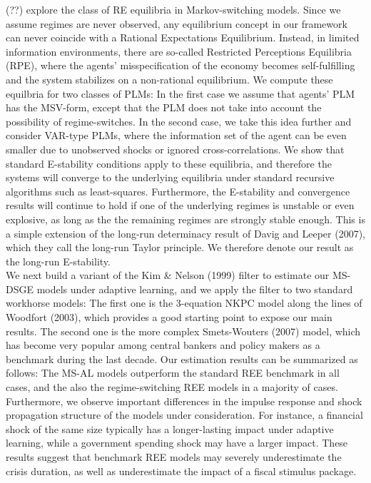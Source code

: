 \documentclass[12pt,reqno]{article}
\numberwithin{equation}{section}
\begin{document}
(??) explore the class of RE equilibria in Markov-switching models. Since we assume regimes are never observed, any equilibrium concept in our framework can never coincide with a Rational Expectations Equilibrium. Instead, in limited information environments, there are so-called Restricted Perceptions Equilibria (RPE), where the agents' misspecification of the economy becomes self-fulfilling and the system stabilizes on a non-rational equilibrium. We compute these equilbria for two classes of PLMs: In the first case we assume that agents' PLM has the MSV-form, except that the PLM does not take into account the possibility of regime-switches. In the second case, we take this idea further and consider VAR-type PLMs, where the information set of the agent can be even smaller due to unobserved shocks or ignored cross-correlations. We show that standard E-stability conditions apply to these equilibria, and therefore the systems will converge to the underlying equilibria under standard recursive algorithms such as least-squares. Furthermore, the E-stability and convergence results will continue to hold if one of the underlying regimes is unstable or even explosive, as long as the the remaining regimes are strongly stable enough. This is a simple extension of the long-run determinacy result of Davig and Leeper (2007), which they call the long-run Taylor principle. We therefore denote our result as the long-run E-stability.\\

We next build a variant of the Kim \& Nelson (1999) filter to estimate our MS-DSGE models under adaptive learning, and we apply the filter to two standard workhorse models: The first one is the 3-equation NKPC model along the lines of Woodfort (2003), which provides a good starting point to expose our main results. The second one is the more complex Smets-Wouters (2007) model, which has become very popular among central bankers and policy makers as a benchmark during the last decade. Our estimation results can be summarized as follows: The MS-AL models outperform the standard REE benchmark in all cases, and the also the regime-switching REE models in a majority of cases. Furthermore, we observe important differences in the impulse response and shock propagation structure of the models under consideration. For instance, a financial shock of the same size typically has a longer-lasting impact under adaptive learning, while a government spending shock may have a larger impact. These results suggest that benchmark REE models may severely underestimate the crisis duration, as well as underestimate the impact of a fiscal stimulus package. \\
\end{document}
